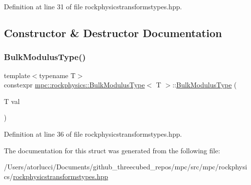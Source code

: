 Definition at line 31 of file rockphysicstransformstypes.\+hpp.



\subsection{Constructor \& Destructor Documentation}
\mbox{\label{structmpc_1_1rockphysics_1_1_bulk_modulus_type_a756c6ccecf169d7f32802d7da8c0fd45}} 
\subsubsection{\texorpdfstring{Bulk\+Modulus\+Type()}{BulkModulusType()}}
{\footnotesize\ttfamily template$<$typename T$>$ \\
constexpr \mbox{\hyperlink{structmpc_1_1rockphysics_1_1_bulk_modulus_type}{mpc\+::rockphysics\+::\+Bulk\+Modulus\+Type}}$<$ T $>$\+::\mbox{\hyperlink{structmpc_1_1rockphysics_1_1_bulk_modulus_type}{Bulk\+Modulus\+Type}} (\begin{DoxyParamCaption}\item[{T}]{val }\end{DoxyParamCaption})\hspace{0.3cm}{\ttfamily [inline]}}



Definition at line 36 of file rockphysicstransformstypes.\+hpp.



The documentation for this struct was generated from the following file\+:\begin{DoxyCompactItemize}
\item 
/\+Users/atorlucci/\+Documents/github\+\_\+threecubed\+\_\+repos/mpc/src/mpc/rockphysics/\mbox{\hyperlink{rockphysicstransformstypes_8hpp}{rockphysicstransformstypes.\+hpp}}\end{DoxyCompactItemize}
